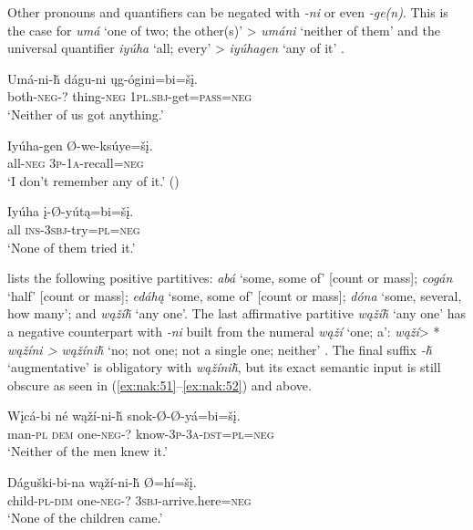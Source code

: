 \documentclass[output=paper,colorlinks,citecolor=brown]{langscibook}
\begin{document}
Other pronouns and quantifiers can be negated with \textit{-ni} or even \textit{-ge(n)}. This is the case for \textit{umá} ‘one of two; the other(s)’ > \textit{umáni} ‘neither of them’  and the universal quantifier \textit{iyúha} ‘all; every’ > \textit{iyúhagen} ‘any of it’ .

\ea\label{ex:nak:49}
    \gll Umá-ni-ȟ dágu-ni ųg-ógini=bi=šį. \\
         both-\textsc{neg-?} thing-\textsc{neg} \textsc{1pl.sbj}-get=\textsc{pass=neg} \\
    \glt ‘Neither of us got anything.' \citep[360]{Cumberland2005}
\z 

\ea\label{ex:nak:50}
    \ea\label{ex:nak:50a}
        \gll Iyúha-gen Ø-we-ksúye=šį.  \\
             all-\textsc{neg} \textsc{3p-1a}-recall=\textsc{neg} \\
        \glt ‘I don’t remember any of it.’ (\citealt[36]{ParksDeMallie2012a})
    
    \ex\label{ex:nak:50b}
        \gll Iyúha į-Ø-yútą=bi=šį. \\
             all \textsc{ins-3sbj}-try=\textsc{pl=neg}\\
        \glt ‘None of them tried it.’
    \z
\z 

\citet[367]{Cumberland2005} lists the following positive partitives: \textit{ab\'{a}} ‘some, some of’ [count or mass]; \textit{cogán} ‘half’ [count or mass]; \textit{edáhą} ‘some, some of’ [count or mass]; \textit{dóna} ‘some, several, how many’; and \textit{wąžíȟ} ‘any one’. The last affirmative partitive \textit{wąžíȟ} ‘any one’ has a negative counterpart with \textit{-ni} built from the numeral \textit{wąží} ‘one; a’: \textit{wąží}> * \textit{wąžíni > wąžíniȟ} ‘no; not one; not a single one; neither’ \citep[362--363]{Cumberland2005}. The final suffix \textit{-ȟ} ‘augmentative’ \citep[according to][363]{Cumberland2005} is obligatory with \textit{wąžíniȟ}, but its exact semantic input is still obscure as seen in (\ref{ex:nak:51}--\ref{ex:nak:52}) and  above.

\ea\label{ex:nak:51}
    \gll Wįcá-bi né wąží-ni-ȟ snok-Ø-Ø-yá=bi=šį. \\
         man-\textsc{pl} \textsc{dem} one-\textsc{neg-?} know-\textsc{3p-3a-dst=pl=neg} \\
    \glt ‘Neither of the men knew it.’
\z 

\ea\label{ex:nak:52}
    \gll Dáguški-bi-na wąží-ni-ȟ Ø=hí=šį. \\
         child-\textsc{pl-dim} one-\textsc{neg-?} \textsc{3sbj}-arrive.here=\textsc{neg} \\
    \glt ‘None of the children came.’
\z 
\end{document}
